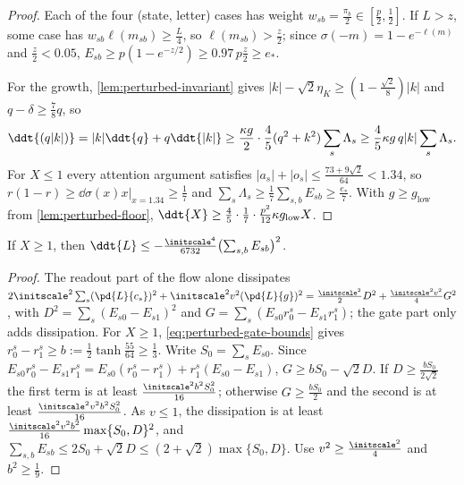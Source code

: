 \begin{proof}
Each of the four (state, letter) cases has weight $w_{sb}=\frac{\pi_b}2\in[\frac p2,\frac12]$. If $L>z$, some case has $w_{sb}\ell(m_{sb})\ge\frac L4$,
so $\ell(m_{sb})>\frac z2$; since $\sigma(-m)=1-e^{-\ell(m)}$ and $\frac z2<0.05$, $E_{sb}\ge p(1-e^{-z/2})\ge0.97\,p\frac z2\ge e_\ast$.

For the growth, \cref{lem:perturbed-invariant} gives $|k|-\sqrt2\eta_K\ge(1-\frac{\sqrt2}8)|k|$ and $q-\delta\ge\frac78q$, so
\[
 \ddt{(q|k|)}=|k|\ddt{q}+q\ddt{|k|}\ge\frac{\kappa g}2\cdot\frac45(q^2+k^2)\sum_s\Lambda_s\ge\frac45\kappa g\,q|k|\sum_s\Lambda_s .
\]
For $X\le1$ every attention argument satisfies $|a_s|+|o_s|\le\frac{73+9\sqrt2}{64}<1.34$, so $r(1-r)\ge\dd{\sigma(x)}{x}\big|_{x=1.34}\ge\frac17$ and
$\sum_s\Lambda_s\ge\frac17\sum_{s,b}E_{sb}\ge\frac{e_\ast}7$. With $g\ge g_{\mathrm{low}}$ from \cref{lem:perturbed-floor},
$\ddt{X}\ge\frac45\cdot\frac17\cdot\frac{p^2}{12}\kappa g_{\mathrm{low}}X$.
\end{proof}

\begin{lemma}
\label{lem:perturbed-descent}
If $X\ge1$, then $\ddt{L}\le-\frac{\initscale^4}{6732}\bigl(\sum_{s,b}E_{sb}\bigr)^2$.
\end{lemma}

\begin{proof}
The readout part of the flow alone dissipates $2\initscale^2\sum_s(\pd{L}{c_s})^2+\initscale^2v^2(\pd{L}{g})^2
=\frac{\initscale^2}2D^2+\frac{\initscale^2v^2}4G^2$, with $D^2=\sum_s(E_{s0}-E_{s1})^2$ and $G=\sum_s(E_{s0}r^s_0-E_{s1}r^s_1)$; the gate part only adds
dissipation. For $X\ge1$, \cref{eq:perturbed-gate-bounds} gives $r^s_0-r^s_1\ge b:=\frac12\tanh\frac{55}{64}\ge\frac13$. Write $S_0=\sum_sE_{s0}$.
Since $E_{s0}r^s_0-E_{s1}r^s_1=E_{s0}(r^s_0-r^s_1)+r^s_1(E_{s0}-E_{s1})$, $G\ge bS_0-\sqrt2D$. If $D\ge\frac{bS_0}{2\sqrt2}$ the first term is at least
$\frac{\initscale^2b^2S_0^2}{16}$; otherwise $G\ge\frac{bS_0}2$ and the second is at least $\frac{\initscale^2v^2b^2S_0^2}{16}$. As $v\le1$, the dissipation is at
least $\frac{\initscale^2v^2b^2}{16}\max\{S_0,D\}^2$, and $\sum_{s,b}E_{sb}\le2S_0+\sqrt2D\le(2+\sqrt2)\max\{S_0,D\}$. Use $v^2\ge\frac{\initscale^2}4$ and
$b^2\ge\frac19$.
\end{proof}

